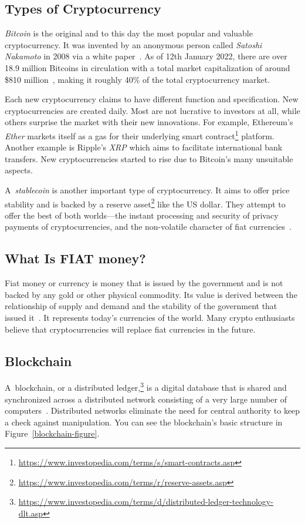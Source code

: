 \subsection*{Types of Cryptocurrency}
\emph{Bitcoin} is the original and to this day the most popular and valuable cryptocurrency. It was invented by an anonymous person called \emph{Satoshi Nakamoto} in 2008 via a white paper~\cite{satoshi}. As of 12th January 2022, there are over 18.9 million Bitcoins in circulation with a total market capitalization of around \$810 million~\cite{coinmarketcap}, making it roughly 40\% of the total cryptocurrency market.

Each new cryptocurrency claims to have different function and specification. New cryptocurrencies are created daily. Most are not lucrative to investors at all, while others surprise the market with their new innovations. For example, Ethereum's \emph{Ether} markets itself as a gas for their underlying smart contract\footnote{\url{https://www.investopedia.com/terms/s/smart-contracts.asp}} platform. Another example is Ripple's \emph{XRP} which aims to facilitate international bank transfers. New cryptocurrencies started to rise due to Bitcoin's many unsuitable aspects.

\label{stablecoins-ref}
A~\emph{stablecoin} is another important type of cryptocurrency. It aims to offer price stability and is backed by a reserve asset\footnote{\url{https://www.investopedia.com/terms/r/reserve-assets.asp}} like the US dollar. They attempt to offer the best of both worlds---the instant processing and security of privacy payments of cryptocurrencies, and the non-volatile character of fiat currencies~\cite{investopedia-stablecoin}.

\subsection*{What Is FIAT money?}
﻿Fiat money or currency is money that is issued by the government and is not backed by any gold or other physical commodity. Its value is derived between the relationship of supply and demand and the stability of the government that issued it~\cite{investopedia-fiat}. It represents today's currencies of the world. Many crypto enthusiasts believe that cryptocurrencies will replace fiat currencies in the future.

\subsection*{Blockchain}
\label{blockchain}
A~blockchain, or a distributed ledger,\footnote{\url{https://www.investopedia.com/terms/d/distributed-ledger-technology-dlt.asp}} is a digital database that is shared and synchronized across a distributed network consisting of a very large number of computers~\cite{investopedia-blockchain}. Distributed networks eliminate the need for central authority to keep a check against manipulation. You can see the blockchain's basic structure in Figure~\ref{blockchain-figure}.


